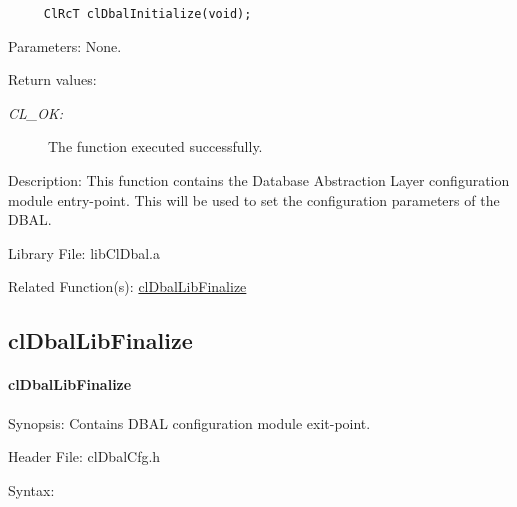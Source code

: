 \begin{flushleft}
\begin{Desc}
\footnotesize\begin{verbatim}     ClRcT clDbalInitialize(void);
\end{verbatim}
\normalsize
\end{Desc}
\begin{Desc}
\item[Parameters:]None.\end{Desc}
\begin{Desc}
\item[Return values:]
\begin{description}
\item[{\em CL\_\-OK:}]The function executed successfully.\end{description}
\end{Desc}
\begin{Desc}
\item[Description:]This function contains the Database Abstraction Layer configuration module entry-point. This will be used to set the configuration 
parameters of the DBAL.\end{Desc}
\begin{Desc}
\item[Library File:]lib\-Cl\-Dbal.a\end{Desc}
\begin{Desc}
\item[Related Function(s):]\hyperlink{pagedbal202}{cl\-Dbal\-Lib\-Finalize} \end{Desc}


\newpage
\subsection{clDbalLibFinalize}
\hypertarget{pagedbal202}{}\paragraph{cl\-Dbal\-Lib\-Finalize}\label{pagedbal202}
\begin{Desc}
\item[Synopsis:]Contains DBAL configuration module exit-point.\end{Desc}
\begin{Desc}
\item[Header File:]clDbalCfg.h\end{Desc}
\begin{Desc}
\item[Syntax:]


\end{Desc}
\end{flushleft}
